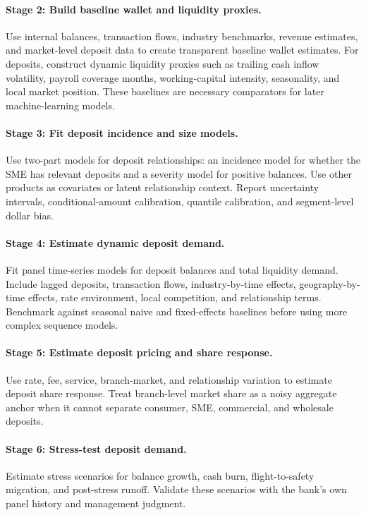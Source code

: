 \documentclass[11pt]{article}
\begin{document}
\paragraph{Stage 2: Build baseline wallet and liquidity proxies.}
Use internal balances, transaction flows, industry benchmarks, revenue
estimates, and market-level deposit data to create transparent baseline wallet
estimates. For deposits, construct dynamic liquidity proxies such as trailing
cash inflow volatility, payroll coverage months, working-capital intensity,
seasonality, and local market position. These baselines are necessary
comparators for later machine-learning models.

\paragraph{Stage 3: Fit deposit incidence and size models.}
Use two-part models for deposit relationships: an incidence model for whether
the SME has relevant deposits and a severity model for positive balances. Use
other products as covariates or latent relationship context. Report uncertainty
intervals, conditional-amount calibration, quantile calibration, and
segment-level dollar bias.

\paragraph{Stage 4: Estimate dynamic deposit demand.}
Fit panel time-series models for deposit balances and total liquidity demand.
Include lagged deposits, transaction flows, industry-by-time effects,
geography-by-time effects, rate environment, local competition, and relationship
terms. Benchmark against seasonal naive and fixed-effects baselines before using
more complex sequence models.

\paragraph{Stage 5: Estimate deposit pricing and share response.}
Use rate, fee, service, branch-market, and relationship variation to estimate
deposit share response. Treat branch-level market share as a noisy aggregate
anchor when it cannot separate consumer, SME, commercial, and wholesale
deposits.

\paragraph{Stage 6: Stress-test deposit demand.}
Estimate stress scenarios for balance growth, cash burn, flight-to-safety
migration, and post-stress runoff. Validate these scenarios with the bank's own
panel history and management judgment.
\end{document}
